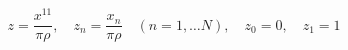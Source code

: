 \begin{equation}
\label{normorb}
z = \frac{x^{11}}{\pi \rho},  \quad z_{n} = \frac{x_{n}}{\pi \rho} \quad
(n = 1, \ldots N), \quad z_{0} = 0, \quad z_{1} = 1 
\end{equation}

